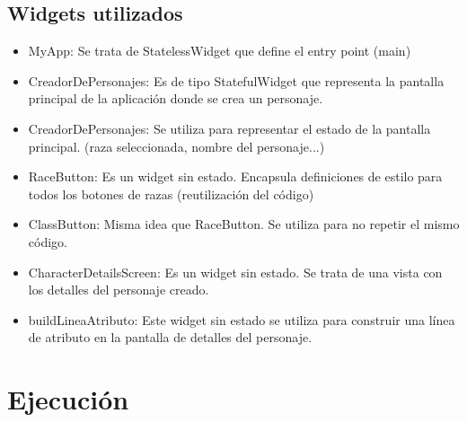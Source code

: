 \documentclass{article}
\begin{document}
\subsection{Widgets utilizados}

\begin{itemize}[label=-]

\item MyApp: 
Se trata de StatelessWidget que define el entry point (main)

\item CreadorDePersonajes: 
Es de tipo StatefulWidget que representa la pantalla principal de la aplicación donde se crea un personaje. 

\item \textunderscore{}CreadorDePersonajes: 
    Se utiliza para representar el estado de la pantalla principal. (raza seleccionada, nombre del personaje...)

\item RaceButton:
    Es un widget sin estado. Encapsula definiciones de estilo para todos los botones de razas (reutilización del código)

\item ClassButton: 
    Misma idea que RaceButton. Se utiliza para no repetir el mismo código.

\item CharacterDetailsScreen: 
    Es un widget sin estado. Se trata de una vista con los detalles del personaje creado.
    

\item buildLineaAtributo:
    Este widget sin estado  se utiliza para construir una línea de atributo en la pantalla de detalles del personaje.

\end{itemize}

\newpage
\section{Ejecución}
\end{document}
